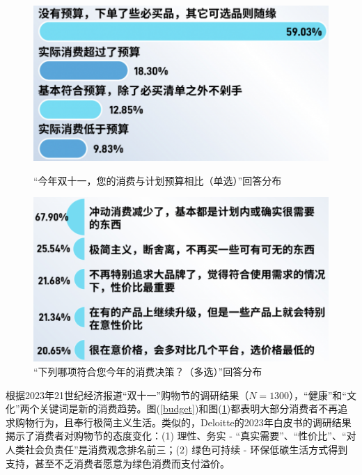 \documentclass[12pt]{ctexart}
\begin{document}
\begin{figure}[htbp!]
    \begin{minipage}[t]{0.45\textwidth}
        \centering
        \includegraphics[width=\textwidth]{Images/16.png}
        \caption{“今年双十一，您的消费与计划预算相比（单选）”回答分布\cite{19}}
        \label{budget}
    \end{minipage}
    \hfill
    \begin{minipage}[t]{0.43\textwidth}
        \centering
        \includegraphics[width=\textwidth]{Images/17.png}
        \caption{“下列哪项符合您今年的消费决策？（多选）”回答分布 \cite{19}}
        \label{decide}
    \end{minipage}
\end{figure}

根据2023年21世纪经济报道“双十一”购物节的调研结果（$N=1300$），“健康”和“文化”两个关键词是新的消费趋势。图(\ref{budget})和图(\ref{decide})都表明大部分消费者不再追求购物行为，且奉行极简主义生活。类似的，Deloitte的2023年白皮书\cite{20}的调研结果揭示了消费者对购物节的态度变化：(1) 理性、务实 - “真实需要”、“性价比”、“对人类社会负责任”是消费观念排名前三；(2) 绿色可持续 - 环保低碳生活方式得到支持，甚至不乏消费者愿意为绿色消费而支付溢价。
\end{document}
